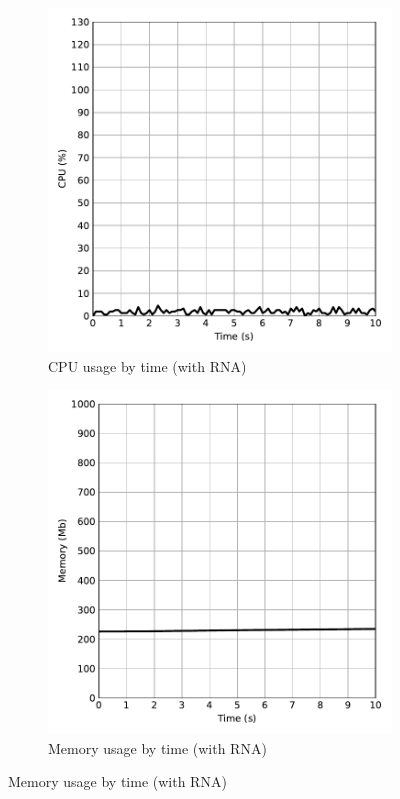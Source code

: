 \begin{figure}[htb]
    \caption{Performance evaluation with RNA}
    \begin{subfigure}{.5\textwidth}
        \centering
        \vspace{1em}
        \caption{CPU usage by time (with RNA)}
        \includegraphics[width=1.0\textwidth]{images/cpu_with_rna.pdf}
    \end{subfigure}%
    \begin{subfigure}{.5\textwidth}
        \centering
        \vspace{1em}
        \caption{Memory usage by time (with RNA)}
        \includegraphics[width=1.0\textwidth]{images/memory_with_rna.pdf}
    \end{subfigure}
    \label{fig:perf_with_rna}
\end{figure}

